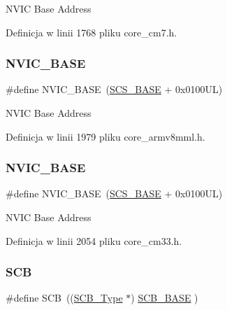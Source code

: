 N\+V\+IC Base Address 

Definicja w linii 1768 pliku core\+\_\+cm7.\+h.

\mbox{\label{group___c_m_s_i_s__core__base_gaa0288691785a5f868238e0468b39523d}} 
\subsubsection{\texorpdfstring{N\+V\+I\+C\+\_\+\+B\+A\+SE}{NVIC\_BASE}\hspace{0.1cm}{\footnotesize\ttfamily [11/12]}}
{\footnotesize\ttfamily \#define N\+V\+I\+C\+\_\+\+B\+A\+SE~(\hyperlink{group___c_m_s_i_s__core__base_ga3c14ed93192c8d9143322bbf77ebf770}{S\+C\+S\+\_\+\+B\+A\+SE} +  0x0100\+U\+L)}

N\+V\+IC Base Address 

Definicja w linii 1979 pliku core\+\_\+armv8mml.\+h.

\mbox{\label{group___c_m_s_i_s__core__base_gaa0288691785a5f868238e0468b39523d}} 
\subsubsection{\texorpdfstring{N\+V\+I\+C\+\_\+\+B\+A\+SE}{NVIC\_BASE}\hspace{0.1cm}{\footnotesize\ttfamily [12/12]}}
{\footnotesize\ttfamily \#define N\+V\+I\+C\+\_\+\+B\+A\+SE~(\hyperlink{group___c_m_s_i_s__core__base_ga3c14ed93192c8d9143322bbf77ebf770}{S\+C\+S\+\_\+\+B\+A\+SE} +  0x0100\+U\+L)}

N\+V\+IC Base Address 

Definicja w linii 2054 pliku core\+\_\+cm33.\+h.

\mbox{\label{group___c_m_s_i_s__core__base_gaaaf6477c2bde2f00f99e3c2fd1060b01}} 
\subsubsection{\texorpdfstring{S\+CB}{SCB}\hspace{0.1cm}{\footnotesize\ttfamily [1/12]}}
{\footnotesize\ttfamily \#define S\+CB~((\hyperlink{struct_s_c_b___type}{S\+C\+B\+\_\+\+Type}       $\ast$)     \hyperlink{group___c_m_s_i_s__core__base_gad55a7ddb8d4b2398b0c1cfec76c0d9fd}{S\+C\+B\+\_\+\+B\+A\+SE}      )}

